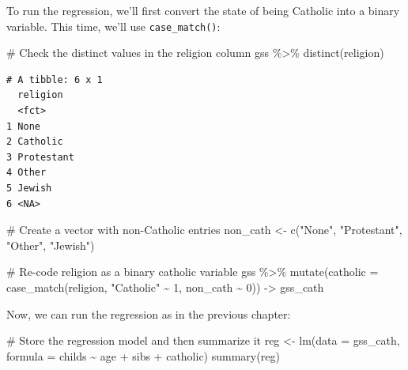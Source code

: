 \documentclass[
  letterpaper,
]{book}
\newenvironment{Shaded}{\begin{snugshade}}{\end{snugshade}}
\newcommand{\AttributeTok}[1]{\textcolor[rgb]{0.40,0.45,0.13}{#1}}
\newcommand{\CommentTok}[1]{\textcolor[rgb]{0.37,0.37,0.37}{#1}}
\newcommand{\DecValTok}[1]{\textcolor[rgb]{0.68,0.00,0.00}{#1}}
\newcommand{\FunctionTok}[1]{\textcolor[rgb]{0.28,0.35,0.67}{#1}}
\newcommand{\NormalTok}[1]{\textcolor[rgb]{0.00,0.23,0.31}{#1}}
\newcommand{\OtherTok}[1]{\textcolor[rgb]{0.00,0.23,0.31}{#1}}
\newcommand{\SpecialCharTok}[1]{\textcolor[rgb]{0.37,0.37,0.37}{#1}}
\newcommand{\StringTok}[1]{\textcolor[rgb]{0.13,0.47,0.30}{#1}}
\begin{document}
To run the regression, we'll first convert the state of being Catholic
into a binary variable. This time, we'll use \texttt{case\_match()}:

\begin{Shaded}
\begin{Highlighting}[]
\CommentTok{\# Check the distinct values in the religion column}
\NormalTok{gss }\SpecialCharTok{\%\textgreater{}\%}
  \FunctionTok{distinct}\NormalTok{(religion)}
\end{Highlighting}
\end{Shaded}

\begin{verbatim}
# A tibble: 6 x 1
  religion  
  <fct>     
1 None      
2 Catholic  
3 Protestant
4 Other     
5 Jewish    
6 <NA>      
\end{verbatim}

\begin{Shaded}
\begin{Highlighting}[]
\CommentTok{\# Create a vector with non{-}Catholic entries}
\NormalTok{non\_cath }\OtherTok{\textless{}{-}} \FunctionTok{c}\NormalTok{(}\StringTok{"None"}\NormalTok{, }\StringTok{"Protestant"}\NormalTok{, }\StringTok{"Other"}\NormalTok{, }\StringTok{"Jewish"}\NormalTok{)}

\CommentTok{\# Re{-}code religion as a binary catholic variable}
\NormalTok{gss }\SpecialCharTok{\%\textgreater{}\%}
  \FunctionTok{mutate}\NormalTok{(}\AttributeTok{catholic =} \FunctionTok{case\_match}\NormalTok{(religion,}
                               \StringTok{"Catholic"} \SpecialCharTok{\textasciitilde{}} \DecValTok{1}\NormalTok{,}
\NormalTok{                               non\_cath }\SpecialCharTok{\textasciitilde{}} \DecValTok{0}\NormalTok{)) }\OtherTok{{-}\textgreater{}}\NormalTok{ gss\_cath}
\end{Highlighting}
\end{Shaded}

Now, we can run the regression as in the previous chapter:

\begin{Shaded}
\begin{Highlighting}[]
\CommentTok{\# Store the regression model and then summarize it}
\NormalTok{reg }\OtherTok{\textless{}{-}} \FunctionTok{lm}\NormalTok{(}\AttributeTok{data =}\NormalTok{ gss\_cath, }\AttributeTok{formula =}\NormalTok{ childs }\SpecialCharTok{\textasciitilde{}}\NormalTok{ age }\SpecialCharTok{+}\NormalTok{ sibs }\SpecialCharTok{+}\NormalTok{ catholic)}
\FunctionTok{summary}\NormalTok{(reg)}
\end{Highlighting}
\end{Shaded}
\end{document}
